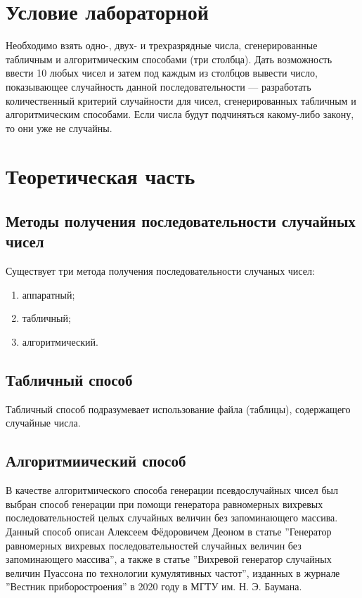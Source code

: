 \section{Условие лабораторной}

Необходимо взять одно-, двух- и трехразрядные числа, сгенерированные табличным и алгоритмическим способами (три столбца). Дать возможность
ввести 10 любых чисел и затем под каждым из столбцов вывести число, показывающее случайность данной последовательности — разработать количественный критерий случайности для чисел, сгенерированных табличным и алгоритмическим способами. Если числа будут подчиняться какому-либо закону, то они уже не случайны.

\section{Теоретическая часть}

\subsection{Методы получения последовательности случайных чисел}

Существует три метода получения последовательности случаных чисел:
\begin{enumerate}
	\item аппаратный;
	\item табличный;
	\item алгоритмический. 
\end{enumerate}

\subsection{Табличный способ}

Табличный способ подразумевает использование файла (таблицы), содержащего случайные числа.

\subsection{Алгоритмиический способ}

В качестве алгоритмического способа генерации псевдослучайных чисел был выбран способ генерации при помощи генератора равномерных вихревых последовательностей целых случайных величин без запоминающего массива.
Данный способ описан Алексеем Фёдоровичем Деоном в статье ''Генератор равномерных вихревых последовательностей случайных величин без запоминающего массива'', а также в статье ''Вихревой генератор случайных величин Пуассона  по технологии кумулятивных частот'', изданных в журнале ''Вестник приборостроения'' в 2020 году в МГТУ им. Н. Э. Баумана.


